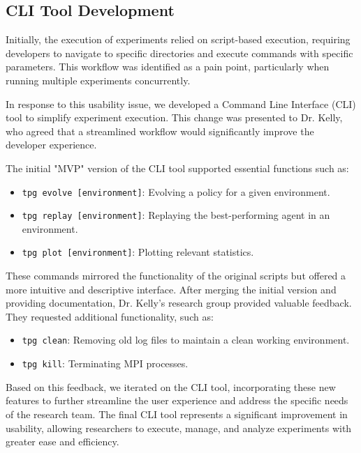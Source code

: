 \documentclass{article}
\begin{document}
\subsection{CLI Tool Development}

Initially, the execution of experiments relied on script-based execution, requiring developers to navigate to specific directories and execute commands with specific parameters. This workflow was identified as a pain point, particularly when running multiple experiments concurrently.

In response to this usability issue, we developed a Command Line Interface (CLI) tool to simplify experiment execution. This change was presented to Dr. Kelly, who agreed that a streamlined workflow would significantly improve the developer experience.

The initial "MVP" version of the CLI tool supported essential functions such as:

\begin{itemize}
    \item \texttt{tpg evolve [environment]}: Evolving a policy for a given environment.
    \item \texttt{tpg replay [environment]}: Replaying the best-performing agent in an environment.
    \item \texttt{tpg plot [environment]}: Plotting relevant statistics.
\end{itemize}

These commands mirrored the functionality of the original scripts but offered a more intuitive and descriptive interface. After merging the initial version and providing documentation, Dr. Kelly's research group provided valuable feedback. They requested additional functionality, such as:

\begin{itemize}
    \item \texttt{tpg clean}: Removing old log files to maintain a clean working environment.
    \item \texttt{tpg kill}: Terminating MPI processes.
\end{itemize}

Based on this feedback, we iterated on the CLI tool, incorporating these new features to further streamline the user experience and address the specific needs of the research team. The final CLI tool represents a significant improvement in usability, allowing researchers to execute, manage, and analyze experiments with greater ease and efficiency.
\end{document}
